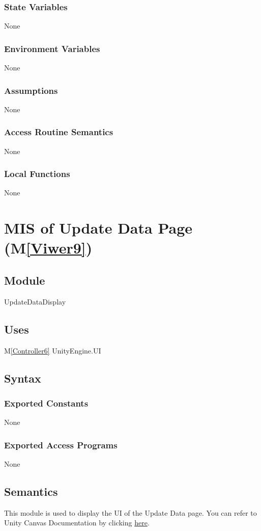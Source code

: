 \documentclass[12pt, titlepage]{article}
\newcommand{\mref}[1]{M\ref{#1}}
\begin{document}
\subsubsection{State Variables}
None
\subsubsection{Environment Variables}
None
\subsubsection{Assumptions}
None
\subsubsection{Access Routine Semantics}
None
\subsubsection{Local Functions}
None

\newpage

\section{MIS of Update Data Page (\mref{Viwer9})}

\subsection{Module}
UpdateDataDisplay

\subsection{Uses}
\mref{Controller6} 
UnityEngine.UI

\subsection{Syntax}
\subsubsection{Exported Constants}
None
\subsubsection{Exported Access Programs}
None

\subsection{Semantics}
This module is used to display the UI of the Update Data page.
You can refer to Unity Canvas Documentation by clicking 
\href{https://docs.unity3d.com/Packages/com.unity.ugui@1.0/manual/class-Canvas.html}{here}.
\end{document}
